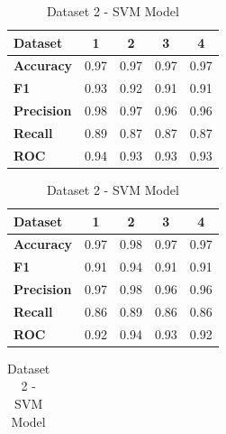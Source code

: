\begin{table}[H]
    \centering
    \caption{SVM model cross-performance results}\label{tab:svm_model_cross-performance_results}
        \begin{subtable}[H]{0.45\textwidth}
            \centering
            \begin{tabular}{|l|c|c|c|c|}
                \hline
                \textbf{Dataset} & \textbf{1} & \textbf{2} & \textbf{3} & \textbf{4} \\
                \hline
                \textbf{Accuracy} & 0.97 & 0.97 & 0.97 & 0.97 \\
                \textbf{F1} & 0.93 & 0.92 & 0.91 & 0.91 \\
                \textbf{Precision} & 0.98 & 0.97 & 0.96 & 0.96 \\
                \textbf{Recall} & 0.89 & 0.87 & 0.87 & 0.87 \\
                \textbf{ROC} & 0.94 & 0.93 & 0.93 & 0.93 \\
                \hline
            \end{tabular}
            \caption{Dataset 1 - SVM Model}\label{subtab:dataset_1_svm_model}
        \end{subtable}
    \quad
    \begin{subtable}[H]{0.45\textwidth}
        \centering
        \begin{tabular}{|l|c|c|c|c|}
            \hline
            \textbf{Dataset} & \textbf{1} & \textbf{2} & \textbf{3} & \textbf{4} \\
            \hline
            \textbf{Accuracy} & 0.97 & 0.98 & 0.97 & 0.97 \\
            \textbf{F1} & 0.91 & 0.94 & 0.91 & 0.91 \\
            \textbf{Precision} & 0.97 & 0.98 & 0.96 & 0.96 \\
            \textbf{Recall} & 0.86 & 0.89 & 0.86 & 0.86 \\
            \textbf{ROC} & 0.92 & 0.94 & 0.93 & 0.92 \\
            \hline
        \end{tabular}
        \caption{Dataset 2 - SVM Model}\label{subtab:dataset_2_svm_model}
    \end{subtable}
    \quad
    \begin{subtable}[H]{0.45\textwidth}
        \centering
        \begin{tabular}{|l|c|c|c|c|}

\end{tabular}
\end{subtable}
\end{table}
